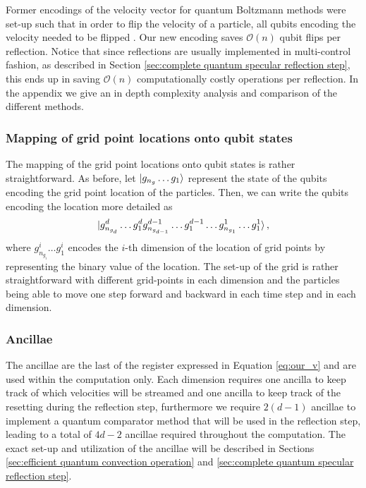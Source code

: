 Former encodings of the velocity vector for quantum Boltzmann methods were set-up such that in order to flip the velocity of a particle, all qubits encoding the velocity needed to be flipped \cite{Todorova2020}. Our new encoding saves $\mathcal{O}\left ( n \right )$ qubit flips per reflection. Notice that since reflections are usually implemented in multi-control fashion, as described in Section \ref{sec:complete quantum specular reflection step}, this ends up in saving $\mathcal{O}\left (n \right )$ computationally costly operations per reflection. In the appendix we give an in depth complexity analysis and comparison of the different methods.

\subsubsection{Mapping of grid point locations onto qubit states}
The mapping of the grid point locations onto qubit states is rather straightforward. As before, let $\ket{g_{n_g} \dots g_1}$ represent the state of the qubits encoding the grid point location of the particles. Then, we can write the qubits encoding the location more detailed as
\begin{equation}
\ket{g^d_{n_{g_d}} \dots g^d_{1} g^{d-1}_{n_{g_{d-1}}} \dots g^{d-1}_{1} \dots  g^1_{n_{g_1}} \dots g^1_{1}},
\end{equation}
where $g^i_{n_{g_i}} \dots g^i_{1} $ encodes the $i$-th dimension of the location of grid points by representing the binary value of the location. The set-up of the grid is rather straightforward with different grid-points in each dimension and the particles being able to move one step forward and backward in each time step and in each dimension. 


\subsubsection{Ancillae}
The ancillae are the last of the register expressed in Equation \eqref{eq:our_v} and are used within the computation only. 
Each dimension requires one ancilla to keep track of which velocities will be streamed and one ancilla to keep track of the resetting
during the reflection step, furthermore we require $2(d-1)$ ancillae to implement a quantum comparator method that will be used in the reflection step, leading to a total of $4d-2$ ancillae required throughout the computation.
The exact set-up and utilization of the ancillae will be described in Sections \ref{sec:efficient quantum convection operation} and \ref{sec:complete quantum specular reflection step}. 


